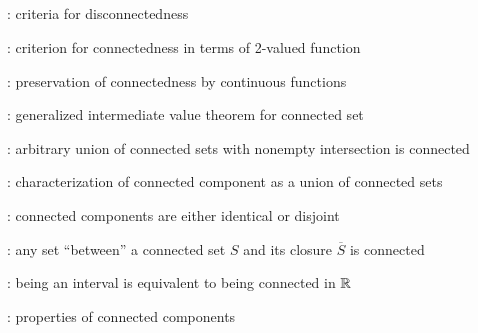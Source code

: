 \subsection*{}
\item {}: criteria for disconnectedness
\item {}: criterion for connectedness in terms of 2-valued function
\item {}: preservation of connectedness by continuous functions
\item {}: generalized intermediate value theorem for connected set
\item {}: arbitrary union of connected sets with nonempty intersection is connected
\item {}: characterization of connected component as a union of connected sets
\item {}: connected components are either identical or disjoint
\item {}: any set ``between'' a connected set \(S\) and its closure \(\overline{S}\) is connected
\item {}: being an interval is equivalent to being connected in \(\mathbb{R}\)
\item {}: properties of connected components
